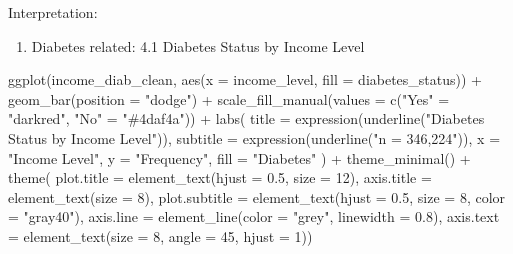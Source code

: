 \documentclass[
  letterpaper,
  DIV=11,
  numbers=noendperiod]{scrartcl}
\newenvironment{Shaded}{\begin{snugshade}}{\end{snugshade}}
\newcommand{\AttributeTok}[1]{\textcolor[rgb]{0.40,0.45,0.13}{#1}}
\newcommand{\DecValTok}[1]{\textcolor[rgb]{0.68,0.00,0.00}{#1}}
\newcommand{\FloatTok}[1]{\textcolor[rgb]{0.68,0.00,0.00}{#1}}
\newcommand{\FunctionTok}[1]{\textcolor[rgb]{0.28,0.35,0.67}{#1}}
\newcommand{\NormalTok}[1]{\textcolor[rgb]{0.00,0.23,0.31}{#1}}
\newcommand{\OtherTok}[1]{\textcolor[rgb]{0.00,0.23,0.31}{#1}}
\newcommand{\SpecialCharTok}[1]{\textcolor[rgb]{0.37,0.37,0.37}{#1}}
\newcommand{\StringTok}[1]{\textcolor[rgb]{0.13,0.47,0.30}{#1}}
\providecommand{\tightlist}{%
  \setlength{\itemsep}{0pt}\setlength{\parskip}{0pt}}\usepackage{longtable,booktabs,array}
\begin{document}
Interpretation:

\begin{enumerate}
\def\labelenumi{\arabic{enumi}.}
\setcounter{enumi}{3}
\tightlist
\item
  Diabetes related: 4.1 Diabetes Status by Income Level
\end{enumerate}

\begin{Shaded}
\begin{Highlighting}[]
\FunctionTok{ggplot}\NormalTok{(income\_diab\_clean, }\FunctionTok{aes}\NormalTok{(}\AttributeTok{x =}\NormalTok{ income\_level, }\AttributeTok{fill =}\NormalTok{ diabetes\_status)) }\SpecialCharTok{+}
  \FunctionTok{geom\_bar}\NormalTok{(}\AttributeTok{position =} \StringTok{"dodge"}\NormalTok{) }\SpecialCharTok{+}
  \FunctionTok{scale\_fill\_manual}\NormalTok{(}\AttributeTok{values =} \FunctionTok{c}\NormalTok{(}\StringTok{"Yes"} \OtherTok{=} \StringTok{"darkred"}\NormalTok{, }\StringTok{"No"} \OtherTok{=} \StringTok{"\#4daf4a"}\NormalTok{)) }\SpecialCharTok{+}
  \FunctionTok{labs}\NormalTok{(}
    \AttributeTok{title =} \FunctionTok{expression}\NormalTok{(}\FunctionTok{underline}\NormalTok{(}\StringTok{"Diabetes Status by Income Level"}\NormalTok{)),}
    \AttributeTok{subtitle =} \FunctionTok{expression}\NormalTok{(}\FunctionTok{underline}\NormalTok{(}\StringTok{"n = 346,224"}\NormalTok{)),}
    \AttributeTok{x =} \StringTok{"Income Level"}\NormalTok{,}
    \AttributeTok{y =} \StringTok{"Frequency"}\NormalTok{,}
    \AttributeTok{fill =} \StringTok{"Diabetes"}
\NormalTok{  ) }\SpecialCharTok{+}
  \FunctionTok{theme\_minimal}\NormalTok{() }\SpecialCharTok{+}
  \FunctionTok{theme}\NormalTok{(}
    \AttributeTok{plot.title =} \FunctionTok{element\_text}\NormalTok{(}\AttributeTok{hjust =} \FloatTok{0.5}\NormalTok{, }
                              \AttributeTok{size =} \DecValTok{12}\NormalTok{),}
    \AttributeTok{axis.title =} \FunctionTok{element\_text}\NormalTok{(}\AttributeTok{size =} \DecValTok{8}\NormalTok{),}
    \AttributeTok{plot.subtitle =} \FunctionTok{element\_text}\NormalTok{(}\AttributeTok{hjust =} \FloatTok{0.5}\NormalTok{,}
                                  \AttributeTok{size =} \DecValTok{8}\NormalTok{, }
                                 \AttributeTok{color =} \StringTok{"gray40"}\NormalTok{),}
    \AttributeTok{axis.line =} \FunctionTok{element\_line}\NormalTok{(}\AttributeTok{color =} \StringTok{"grey"}\NormalTok{, }
                          \AttributeTok{linewidth =} \FloatTok{0.8}\NormalTok{),}
    \AttributeTok{axis.text =} \FunctionTok{element\_text}\NormalTok{(}\AttributeTok{size =} \DecValTok{8}\NormalTok{, }
                            \AttributeTok{angle =} \DecValTok{45}\NormalTok{,}
                            \AttributeTok{hjust =} \DecValTok{1}\NormalTok{))}
\end{Highlighting}
\end{Shaded}
\end{document}
